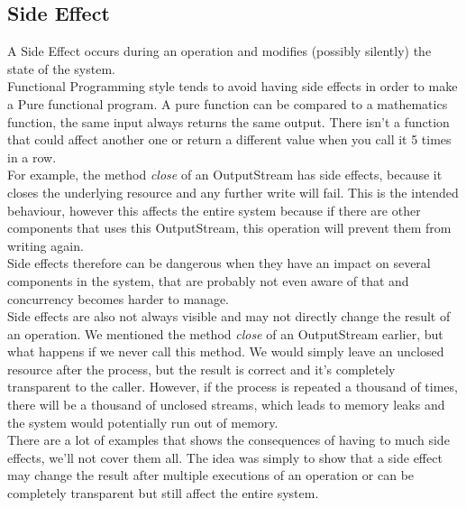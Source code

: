 \subsection{Side Effect}\label{subsec:side-effect}
A Side Effect occurs during an operation and modifies (possibly silently)
the state of the system. \\
Functional Programming style tends to avoid having side effects in order
to make a Pure functional program.
A pure function can be compared to a mathematics function, the same
input always returns the same output.
There isn't a function that could affect another one or return a
different value when you call it 5 times in a row. \\
\newline
For example, the method \textit{close} of an OutputStream has side
effects, because it closes the underlying resource and any further
write will fail.
This is the intended behaviour, however this affects the entire system
because if there are other components that uses this OutputStream, this
operation will prevent them from writing again. \\
Side effects therefore can be dangerous when they have an impact on
several components in the system, that are probably not even aware of
that and concurrency becomes harder to manage. \\
\newline
Side effects are also not always visible and may not directly change the
result of an operation.
We mentioned the method \textit{close} of an OutputStream earlier, but
what happens if we never call this method.
We would simply leave an unclosed resource after the process, but the
result is correct and it's completely transparent to the caller.
However, if the process is repeated a thousand of times, there will be
a thousand of unclosed streams, which leads to memory leaks and the
system would potentially run out of memory. \\
\newline
There are a lot of examples that shows the consequences of having
to much side effects, we'll not cover them all.
The idea was simply to show that a side effect may change the result
after multiple executions of an operation or can be completely
transparent but still affect the entire system.

